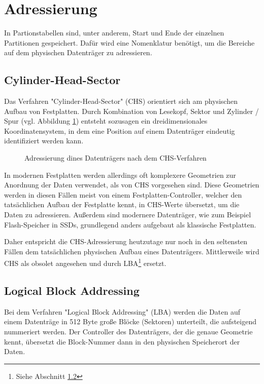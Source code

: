 \section{Adressierung}
In Partionstabellen sind, unter anderem, Start und Ende der einzelnen Partitionen gespeichert.
Dafür wird eine Nomenklatur benötigt, um die Bereiche auf dem physischen Datenträger zu adressieren.

\subsection{Cylinder-Head-Sector}
Das Verfahren "Cylinder-Head-Sector" (CHS) orientiert sich am physischen Aufbau von Festplatten.
Durch Kombination von Lesekopf, Sektor und Zylinder / Spur (vgl. Abbildung \ref{fig:chs}) entsteht sozusagen ein dreidimensionales Koordinatensystem, in dem eine Position auf einem Datenträger eindeutig identifiziert werden kann.

\begin{figure}[ht]
    \centering
    \fbox{}
    \caption{Adressierung dines Datenträgers nach dem CHS-Verfahren}
    \label{fig:chs}
\end{figure}

In modernen Festplatten werden allerdings oft komplexere Geometrien zur Anordnung der Daten verwendet, als von CHS vorgesehen sind.
Diese Geometrien werden in diesen Fällen meist von einem Festplatten-Controller, welcher den tatsächlichen Aufbau der Festplatte kennt, in CHS-Werte übersetzt, um die Daten zu adressieren.\cite{pollard2011}
Außerdem sind modernere Datenträger, wie zum Beispiel Flash-Speicher in SSDs, grundlegend anders aufgebaut als klassische Festplatten.

Daher entspricht die CHS-Adressierung heutzutage nur noch in den seltensten Fällen dem tatsächlichen physischen Aufbau eines Datenträgers. 
Mittlerweile wird CHS als obsolet angesehen und durch LBA\footnote{Siehe Abschnitt \ref{sec:LBA}} ersetzt.


\subsection{Logical Block Addressing}
\label{sec:LBA}
Bei dem Verfahren "Logical Block Addressing" (LBA) werden die Daten auf einem Datenträge in 512 Byte große Blöcke (Sektoren) unterteilt, die aufsteigend nummeriert werden.
Der Controller des Datenträgers, der die genaue Geometrie kennt, übersetzt die Block-Nummer dann in den physischen Speicherort der Daten.
